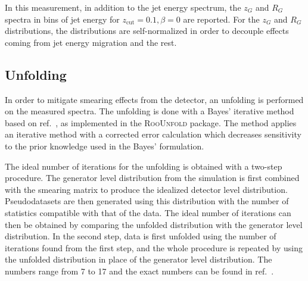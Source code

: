 \documentclass[aps,preprint,superscriptaddress,groupedaddress]{revtex4}  %
\newcommand{\zg}{\ensuremath{z_G}\xspace}
\newcommand{\Rg}{\ensuremath{R_G}\xspace}
\begin{document}
In this measurement, in addition to the jet energy spectrum, the \zg and \Rg spectra in bins of jet energy for $z_\text{cut} = 0.1, \beta = 0$ are reported.  For the \zg and \Rg distributions, the distributions are self-normalized in order to decouple effects coming from jet energy migration and the rest.


\subsection{Unfolding}

In order to mitigate smearing effects from the detector, an unfolding is performed on the measured spectra.  The unfolding is done with a Bayes' iterative method based on ref.~\cite{Dagostini:1994fjx}, as implemented in the \textsc{RooUnfold} package.  The method applies an iterative method with a corrected error calculation which decreases sensitivity to the prior knowledge used in the Bayes' formulation.

The ideal number of iterations for the unfolding is obtained with a two-step procedure.  The generator level distribution from the simulation is first combined with the smearing matrix to produce the idealized detector level distribution.  Pseudodatasets are then generated using this distribution with the number of statistics compatible with that of the data.  The ideal number of iterations can then be obtained by comparing the unfolded distribution with the generator level distribution.  In the second step, data is first unfolded using the number of iterations found from the first step, and the whole procedure is repeated by using the unfolded distribution in place of the generator level distribution.  The numbers range from 7 to 17 and the exact numbers can be found in ref.~\cite{Chen:2021iyj}.
\end{document}
